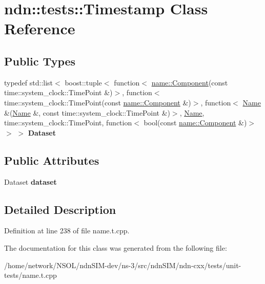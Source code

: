 \hypertarget{classndn_1_1tests_1_1Timestamp}{}\section{ndn\+:\+:tests\+:\+:Timestamp Class Reference}
\label{classndn_1_1tests_1_1Timestamp}
\subsection*{Public Types}
\begin{DoxyCompactItemize}
\item 
typedef std\+::list$<$ boost\+::tuple$<$ function$<$ \hyperlink{classndn_1_1name_1_1Component}{name\+::\+Component}(const time\+::system\+\_\+clock\+::\+Time\+Point \&)$>$, function$<$ time\+::system\+\_\+clock\+::\+Time\+Point(const \hyperlink{classndn_1_1name_1_1Component}{name\+::\+Component} \&)$>$, function$<$ \hyperlink{classndn_1_1Name}{Name} \&(\hyperlink{classndn_1_1Name}{Name} \&, const time\+::system\+\_\+clock\+::\+Time\+Point \&)$>$, \hyperlink{classndn_1_1Name}{Name}, time\+::system\+\_\+clock\+::\+Time\+Point, function$<$ bool(const \hyperlink{classndn_1_1name_1_1Component}{name\+::\+Component} \&)$>$ $>$ $>$ {\bfseries Dataset}\hypertarget{classndn_1_1tests_1_1Timestamp_a1827cfbf57be04e5ba0ecb2f62e1d028}{}\label{classndn_1_1tests_1_1Timestamp_a1827cfbf57be04e5ba0ecb2f62e1d028}

\end{DoxyCompactItemize}
\subsection*{Public Attributes}
\begin{DoxyCompactItemize}
\item 
Dataset {\bfseries dataset}\hypertarget{classndn_1_1tests_1_1Timestamp_a43698b4d69315ac3128322a46fa5d97b}{}\label{classndn_1_1tests_1_1Timestamp_a43698b4d69315ac3128322a46fa5d97b}

\end{DoxyCompactItemize}


\subsection{Detailed Description}


Definition at line 238 of file name.\+t.\+cpp.



The documentation for this class was generated from the following file\+:\begin{DoxyCompactItemize}
\item 
/home/network/\+N\+S\+O\+L/ndn\+S\+I\+M-\/dev/ns-\/3/src/ndn\+S\+I\+M/ndn-\/cxx/tests/unit-\/tests/name.\+t.\+cpp\end{DoxyCompactItemize}
